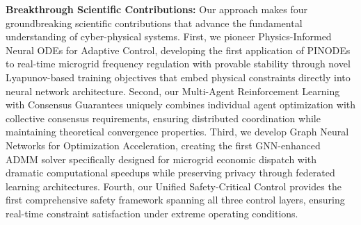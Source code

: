 \documentclass[12pt]{article}
\begin{document}
\textbf{Breakthrough Scientific Contributions:} Our approach makes four groundbreaking scientific contributions that advance the fundamental understanding of cyber-physical systems. First, we pioneer Physics-Informed Neural ODEs for Adaptive Control, developing the first application of PINODEs to real-time microgrid frequency regulation with provable stability through novel Lyapunov-based training objectives that embed physical constraints directly into neural network architecture. Second, our Multi-Agent Reinforcement Learning with Consensus Guarantees uniquely combines individual agent optimization with collective consensus requirements, ensuring distributed coordination while maintaining theoretical convergence properties. Third, we develop Graph Neural Networks for Optimization Acceleration, creating the first GNN-enhanced ADMM solver specifically designed for microgrid economic dispatch with dramatic computational speedups while preserving privacy through federated learning architectures. Fourth, our Unified Safety-Critical Control provides the first comprehensive safety framework spanning all three control layers, ensuring real-time constraint satisfaction under extreme operating conditions.

\begin{center}
\end{center}
\end{document}
